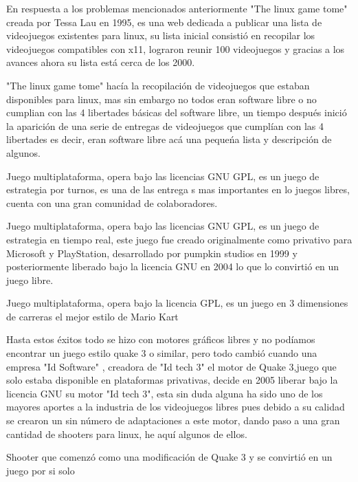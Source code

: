 \begin{multicols}{2}
En respuesta a los problemas  mencionados anteriormente "The linux game tome" creada
por Tessa Lau en 1995, es  una web dedicada a publicar una lista de videojuegos existentes
para linux, su lista inicial consistió en recopilar los videojuegos compatibles con x11, lograron
reunir 100 videojuegos y gracias a los avances ahora su lista está cerca de los 2000.


"The linux game tome" hacía la recopilación de videojuegos que estaban disponibles para linux, 
mas sin embargo no todos eran software libre o no cumplian con las 4 libertades básicas del software 
libre, un tiempo después inició la aparición de una serie de entregas de videojuegos que cumplían con 
las 4 libertades es decir, eran software libre acá una pequeńa lista y descripción de algunos.

Juego multiplataforma, opera bajo las licencias GNU GPL, es un juego de estrategia por 
turnos, es una de las entrega	s mas importantes en lo juegos libres, cuenta con una gran comunidad de colaboradores.

Juego multiplataforma, opera bajo las licencias GNU GPL, es un juego de estrategia en tiempo real, 
este juego fue creado originalmente como privativo para Microsoft y PlayStation, desarrollado por pumpkin studios
en 1999 y posteriormente liberado bajo la licencia GNU en 2004 lo que lo convirtió en un juego libre.

Juego multiplataforma, opera bajo la licencia GPL, es un juego en 3 dimensiones de carreras
el mejor estilo de Mario Kart

Hasta estos éxitos todo se hizo con motores gráficos libres y no podíamos encontrar un juego estilo quake 3 
o similar, pero todo cambió cuando una empresa "Id Software" , creadora de "Id tech 3" el motor de Quake 3,juego
que solo estaba disponible en plataformas privativas, decide en 2005 liberar bajo la licencia GNU su motor "Id tech 3",
esta sin duda alguna ha sido uno de los mayores aportes a la industria de los videojuegos libres pues debido a su calidad
se crearon un sin número de adaptaciones a este motor, dando paso a una gran cantidad de shooters para linux, he aquí
algunos de ellos.

Shooter que comenzó como una modificación de Quake 3 y se convirtió en un juego por si solo


\end{multicols}
